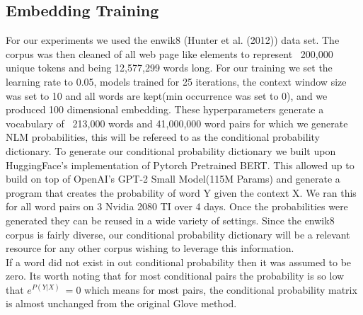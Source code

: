 \documentclass[11pt]{article}
\begin{document}
\subsection{Embedding Training}
For our experiments we used the enwik8 (Hunter et al. (2012)) data set. The corpus was then cleaned of all web page like elements to represent ~200,000 unique tokens and being 12,577,299 words long. For our training we set the learning rate to 0.05, models trained for 25 iterations, the context window size was set to 10 and all words are kept(min occurrence was set to 0), and we produced 100 dimensional embedding. These hyperparameters generate a vocabulary of ~213,000 words and 41,000,000 word pairs for which we generate NLM probabilities, this will be refereed to as the conditional probability dictionary. 
To generate our conditional probability dictionary we built upon HuggingFace's implementation of Pytorch Pretrained BERT. This allowed up to build on top of OpenAI's GPT-2 Small Model(115M Params) and generate a program that creates the probability of word Y given the context X. We ran this for all word pairs on 3 Nvidia 2080 TI over 4 days. Once the probabilities were generated they can be reused in a wide variety of settings. Since the enwik8 corpus is fairly diverse, our conditional probability dictionary will be a relevant resource for any other corpus wishing to leverage this information.\\ If a word did not exist in out conditional probability then it was assumed to be zero. Its worth noting that for most conditional pairs the probability is so low that $e^{P(Y|X)} ~= 0$ which means for most pairs, the conditional probability matrix is almost unchanged from the original Glove method. \\
\end{document}

